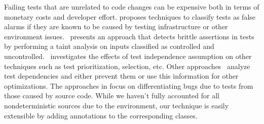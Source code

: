 Failing tests that are unrelated to code changes can be expensive both in terms of monetary costs and
developer effort. \cite{Herzig:2015:EDF:2819009.2819018} proposes techniques to classify tests as false alarms
if they are known to be caused by testing infrastructure or other environment issues.~\cite{Huo:2014:IOQ:2635868.2635917}
presents an approach that detects brittle assertions in tests by performing a taint analysis on inputs classified as 
controlled and uncontrolled.~\cite{ZhangJWMLEN2014} investigates the effects of test independence assumption
on other techniques such as test prioritization, selection, etc. Other approaches~\cite{BellKMD2015,Gyori:2015:RTD:2771783.2771793}
analyze test dependencies and either prevent them or use this information for other optimizations.
The approaches in \cite{Dan:2013:10.1007/978-3-642-39038-8_25,Vahabzadeh:2015:7332456} focus on differentiating bugs due to tests
from those caused by source code. While we haven't fully accounted for all nondeterministic sources due
to the environment, our technique is easily extensible by adding annotations to the corresponding classes.


